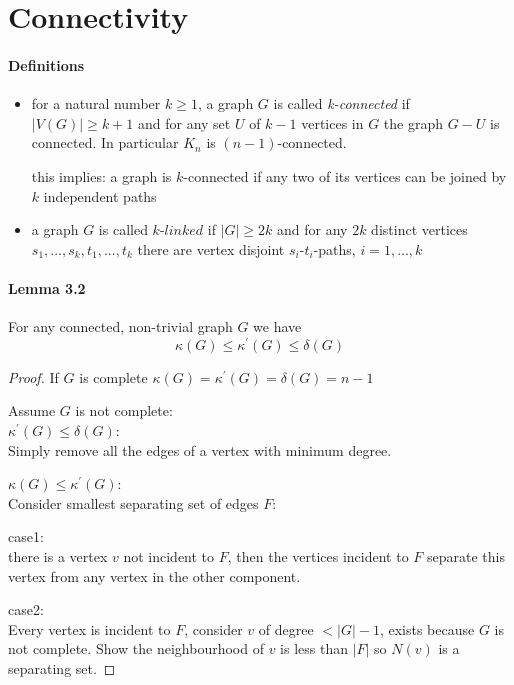 \section{Connectivity}

\paragraph{Definitions}
\begin{itemize}
    \item for a natural number $ k \geq 1 $, a graph $ G $ is called 
    \textit{k-connected} if $ |V(G)| \geq k + 1 $ and for any set $ U $ of $ k - 1 $
    vertices in $ G $ the graph $ G - U $ is connected. In particular $ K_n $ is
    $(n-1)$-connected.

    \smallskip \noindent
    this implies: a graph is $k$-connected if any two of its vertices 
    can be joined by $k$ independent paths

    \item a graph $ G $ is called $k$-$linked$ if $ |G| \geq 2k $ and for any $ 2k $ 
    distinct vertices $s_1,...,s_k,t_1,...,t_k$ there are vertex disjoint 
    $s_i$-$t_i$-paths, $i = 1,...,k$
    
\end{itemize}

\paragraph{Lemma 3.2} For any connected, non-trivial graph $ G $ we have
$$ \kappa(G) \leq \kappa^\prime(G) \leq \delta(G) $$
\begin{proof}
   If $ G $ is complete $\kappa(G) = \kappa^\prime(G) = \delta(G) = n - 1$ 

   \smallskip
   Assume $ G $ is not complete: \\
   $ \kappa^\prime(G) \leq \delta(G) $: \\
   Simply remove all the edges of a vertex with minimum degree.

   \smallskip
   $ \kappa(G) \leq \kappa^\prime(G)$: \\
   Consider smallest separating set of edges $ F $:

   \smallskip \noindent
   case1: \\
   there is a vertex $ v $ not incident to $ F $, then the vertices incident
   to $ F $ separate this vertex from any vertex in the other component.


   \smallskip \noindent
   case2: \\
   Every vertex is incident to $ F $, consider $ v $ of degree $ < |G| - 1 $, 
   exists because $ G $ is not complete. Show the neighbourhood of $ v $ 
   is less than $ |F| $ so $ N(v) $ is a separating set.
\end{proof}


